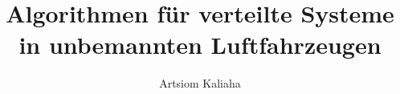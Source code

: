 \documentclass[bachelor,german,smartquotes]{hgbthesis}
\title{Algorithmen für verteilte Systeme in unbemannten Luftfahrzeugen}
\author{Artsiom Kaliaha}
\begin{document}

\frontmatter                    %

\maketitle
\tableofcontents

		
			

\mainmatter          %






\appendix                                            %


\MakeBibliography                        %



\end{document}
